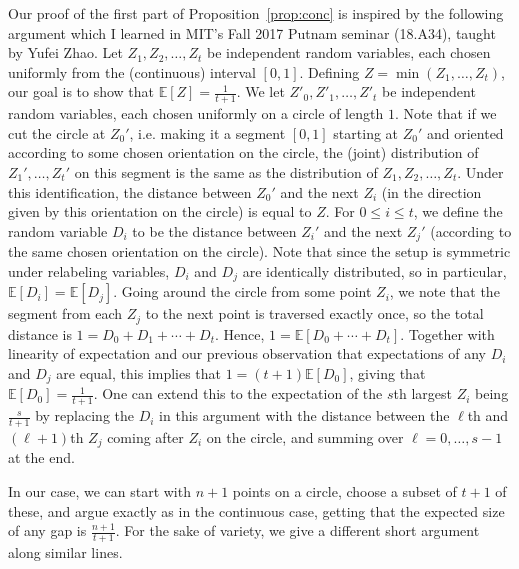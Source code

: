 \documentclass{amsart}
\theoremstyle{definition}
\begin{document}
Our proof of the first part of Proposition~\ref{prop:conc} is inspired by the following argument which I learned in MIT's Fall 2017 Putnam seminar (18.A34), taught by Yufei Zhao. Let $Z_1, Z_2,\ldots, Z_t$ be independent random variables, each chosen uniformly from the (continuous) interval $[0,1]$. Defining $Z=\min(Z_1,\ldots, Z_t)$, our goal is to show that $\mathbb{E}[Z]=\frac{1}{t+1}$. We let $Z'_0,Z'_1,\ldots, Z'_t$ be independent random variables, each chosen uniformly on a circle of length $1$. Note that if we cut the circle at $Z_0'$, i.e. making it a segment $[0,1]$ starting at $Z_0'$ and oriented according to some chosen orientation on the circle, the (joint) distribution of $Z_1', \ldots, Z_t'$ on this segment is the same as the distribution of $Z_1,Z_2,\ldots,Z_t$. Under this identification, the distance between $Z_0'$ and the next $Z_i$ (in the direction given by this orientation on the circle) is equal to $Z$. For $0\leq i\leq t$, we define the random variable $D_i$ to be the distance between $Z_i'$ and the next $Z_j'$ (according to the same chosen orientation on the circle). Note that since the setup is symmetric under relabeling variables, $D_i$ and $D_j$ are identically distributed, so in particular, $\mathbb{E}[D_i]=\mathbb{E}[D_j]$. Going around the circle from some point $Z_i$, we note that the segment from each $Z_j$ to the next point is traversed exactly once, so the total distance is $1=D_0+D_1+\cdots+D_t$. Hence, $1=\mathbb{E}[D_0+\cdots+D_t]$. Together with linearity of expectation and our previous observation that expectations of any $D_i$ and $D_j$ are equal, this implies that $1=(t+1)\mathbb{E}[D_0]$, giving that $\mathbb{E}[D_0]=\frac{1}{t+1}$. One can extend this to the expectation of the $s$th largest $Z_i$ being $\frac{s}{t+1}$ by replacing the $D_i$ in this argument with the distance between the $\ell$th and $(\ell+1)$th $Z_j$ coming after $Z_i$ on the circle, and summing over $\ell=0,\ldots,s-1$ at the end.

In our case, we can start with $n+1$ points on a circle, choose a subset of $t+1$ of these, and argue exactly as in the continuous case, getting that the expected size of any gap is $\frac{n+1}{t+1}$. For the sake of variety, we give a different short argument along similar lines.
\end{document}
